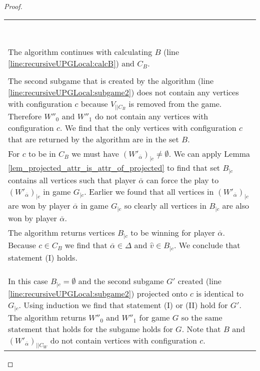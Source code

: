 \begin{theorem}
\begin{proof}
\begin{longtable}{|p{14.2cm}}
\begin{tabular}{|p{14cm}}
			\end{tabular}\\\\
			\begin{tabular}{|p{14cm}}
				Assume $(W'_{\overline{\alpha}})_{|\backslash C_W} \neq \emptyset$ (line \ref{line:recursiveUPGLocal:wopponentwithoutCWisempty})\\
				\hline
				The algorithm continues with calculating $B$ (line \ref{line:recursiveUPGLocal:calcB}) and $C_B$.\\
				\begin{tabular}{|p{13.8cm}}
					Assume $c \in C_B$\\
					\hline
					The second subgame that is created by the algorithm (line \ref{line:recursiveUPGLocal:subgame2}) does not contain any vertices with configuration $c$ because $V_{||C_B}$ is removed from the game. Therefore $W''_0$ and $W''_1$ do not contain any vertices with configuration $c$. We find that the only vertices with configuration $c$ that are returned by the algorithm are in the set $B$.\\
					For $c$ to be in $C_B$ we must have $(W'_{\overline{\alpha}})_{|c} \neq \emptyset$. We can apply Lemma \ref{lem_projected_attr_is_attr_of_projected} to find that set $B_{|c}$ contains all vertices such that player $\overline{\alpha}$ can force the play to $(W'_{\overline{\alpha}})_{|c}$ in game $G_{|c}$. Earlier we found that all vertices in $(W'_{\overline{\alpha}})_{|c}$ are won by player $\overline{\alpha}$ in game $G_{|c}$ so clearly all vertices in $B_{|c}$ are also won by player $\overline{\alpha}$.\\
					The algorithm returns vertices $B_{|c}$ to be winning for player $\overline{\alpha}$. Because $c \in C_B$ we find that $\overline{\alpha} \in \Delta$ and $\hat{v}\in B_{|c}$. We conclude that statement (I) holds.
				\end{tabular}\\\\
				\begin{tabular}{|p{13.8cm}}
					Assume $c \notin C_B$\\
					\hline
					\begin{tabular}{|p{13.6cm}}
						Assume $(W'_{\overline{\alpha}})_{|c} = \emptyset$\\
						\hline
						In this case $B_{|c} = \emptyset$ and the second subgame $G'$ created (line \ref{line:recursiveUPGLocal:subgame2}) projected onto $c$ is identical to $G_{|c}$. Using induction we find that statement (I) or (II) hold for $G'$. The algorithm returns $W''_0$ and $W''_1$ for game $G$ so the same statement that holds for the subgame holds for $G$. Note that $B$ and $(W'_{\overline{\alpha}})_{||C_W}$ do not contain vertices with configuration $c$.

\end{tabular}
\end{tabular}
\end{tabular}
\end{longtable}
\end{proof}
\end{theorem}
